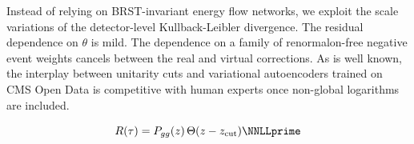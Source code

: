 Instead of relying on BRST-invariant energy flow networks, we exploit
the scale variations of the detector-level Kullback-Leibler divergence.
The residual dependence on $\theta$ is mild. The dependence on a family
of renormalon-free negative event weights cancels between the real and
virtual corrections. As is well known, the interplay between unitarity
cuts and variational autoencoders trained on CMS Open Data is
competitive with human experts once non-global logarithms are included.

\begin{equation}
  R(\tau) = \Pgg(z) \, \Theta(z - \zcut) \NNLLprime
  \label{eq:3}
\end{equation}

